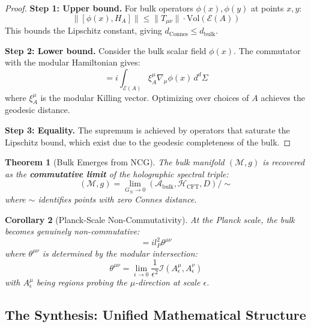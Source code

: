 \documentclass[12pt,a4paper]{article}
\newtheorem{theorem}{Theorem}[section]
\newtheorem{corollary}[theorem]{Corollary}
\begin{document}
\begin{proof}
\textbf{Step 1: Upper bound.} For bulk operators $\phi(x), \phi(y)$ at points $x, y$:
\begin{equation}
\|[\phi(x), H_A]\| \leq \|T_{\mu\nu}\| \cdot \text{Vol}(\mathcal{E}(A))
\end{equation}
This bounds the Lipschitz constant, giving $d_{\text{Connes}} \leq d_{\text{bulk}}$.

\textbf{Step 2: Lower bound.} Consider the bulk scalar field $\phi(x)$. The commutator with the modular Hamiltonian gives:
\begin{equation}
[H_A, \phi(x)] = i \int_{\mathcal{E}(A)} \xi_A^\mu \nabla_\mu \phi(x) \, d^d\Sigma
\end{equation}
where $\xi_A^\mu$ is the modular Killing vector. Optimizing over choices of $A$ achieves the geodesic distance.

\textbf{Step 3: Equality.} The supremum is achieved by operators that saturate the Lipschitz bound, which exist due to the geodesic completeness of the bulk.
\end{proof}

\begin{theorem}[Bulk Emerges from NCG]\label{thm:bulk-ncg}
The bulk manifold $(\mathcal{M}, g)$ is recovered as the \textbf{commutative limit} of the holographic spectral triple:
\begin{equation}
(\mathcal{M}, g) = \lim_{G_N \to 0} (\mathcal{A}_{\text{bulk}}, \mathcal{H}_{\text{CFT}}, D) / \sim
\end{equation}
where $\sim$ identifies points with zero Connes distance.
\end{theorem}

\begin{corollary}[Planck-Scale Non-Commutativity]\label{cor:planck-ncg}
At the Planck scale, the bulk becomes genuinely non-commutative:
\begin{equation}
[x^\mu, x^\nu] = i l_P^2 \theta^{\mu\nu}
\end{equation}
where $\theta^{\mu\nu}$ is determined by the modular intersection:
\begin{equation}
\theta^{\mu\nu} = \lim_{\epsilon \to 0} \frac{1}{\epsilon^2} \mathcal{I}(A^\mu_\epsilon, A^\nu_\epsilon)
\end{equation}
with $A^\mu_\epsilon$ being regions probing the $\mu$-direction at scale $\epsilon$.
\end{corollary}

\subsection{The Synthesis: Unified Mathematical Structure}
\end{document}
